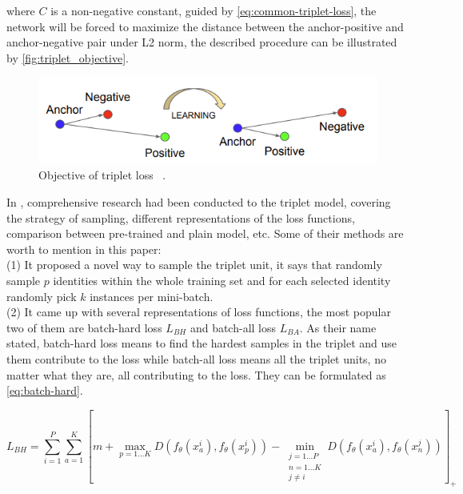 where $C$ is a non-negative constant, guided by \autoref{eq:common-triplet-loss}, the network will be forced to maximize the distance between
the anchor-positive and anchor-negative pair under L2 norm, the described procedure can be illustrated by \autoref{fig:triplet_objective}.

\begin{figure}
    \includegraphics[width=\linewidth]{figures/triplet_objective.png}
    \caption{Objective of triplet loss ~\protect \cite{facenet-triplet-model}.}
    \label{fig:triplet_objective}
\end{figure}

In \cite{in-defense-of-triplet-loss-for-reid-2017}, comprehensive research had been conducted to the triplet model, covering the
strategy of sampling, different representations of the loss functions, comparison between pre-trained and plain model, etc. Some of their
methods are worth to mention in this paper:\\
(1) It proposed a novel way to sample the triplet unit, it says that randomly sample $p$ identities within the whole training set and for
each selected identity randomly pick $k$ instances per mini-batch.\\
(2) It came up with several representations of loss functions, the most popular two of them are batch-hard loss $L_{BH}$ and batch-all loss $L_{BA}$.
As their name stated, batch-hard loss means to find the hardest samples in the triplet and use them contribute to the loss while batch-all loss means all
the triplet units, no matter what they are, all contributing to the loss. They can be formulated as \autoref{eq:batch-hard}.

\begin{equation}
\label{eq:batch-hard}
     L_{BH} = \sum_{i=1}^{P} \sum_{a=1}^{K}
            [
                m + \max_{p=1...K} D(f_{\theta}(x_{a}^i), f_{\theta}(x_{p}^i))
                - \min_{\substack{j=1...P\\ n=1...K\\ j\neq i}}
                D(f_{\theta}(x_{a}^i), f_{\theta}(x_{n}^j))
            ]_+
\end{equation}

